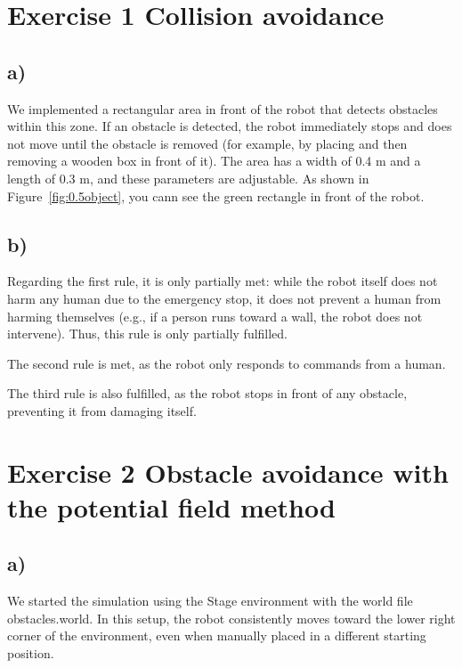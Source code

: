 \documentclass[template,12pt,a4paper,enabledeprecatedfontcommands]{template}
\begin{document}
\vspace*{-1em}

\section{Exercise 1 Collision avoidance}
\subsection{a)}

We implemented a rectangular area in front of the robot that detects obstacles within this zone. If an obstacle is detected, the robot immediately stops and does not move until the obstacle is removed (for example, by placing and then removing a wooden box in front of it). The area has a width of 0.4 m and a length of 0.3 m, and these parameters are adjustable. As shown in Figure~\ref{fig:0.5object}, you cann see the green rectangle in front of the robot.

\subsection{b)}

Regarding the first rule, it is only partially met: while the robot itself does not harm any human due to the emergency stop, it does not prevent a human from harming themselves (e.g., if a person runs toward a wall, the robot does not intervene). Thus, this rule is only partially fulfilled.

\noindent The second rule is met, as the robot only responds to commands from a human.

\noindent The third rule is also fulfilled, as the robot stops in front of any obstacle, preventing it from damaging itself.

\section{Exercise 2 Obstacle avoidance with the potential field method}

\subsection{a)}

We started the simulation using the Stage environment with the world file obstacles.world. In this setup, the robot consistently moves toward the lower right corner of the environment, even when manually placed in a different starting position.
\end{document}
